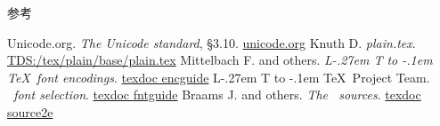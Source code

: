 \documentclass{beamer}
\makeatletter
\DeclareRobustCommand\LaTeX{L\kern-.27em%
  {\sbox\z@ T%
   \vbox to\ht\z@{\hbox{\check@mathfonts
                        \fontsize\sf@size\z@
                        \math@fontsfalse\selectfont
                        A}%
                  \vss}%
  }%
  \kern-.1em%
  \TeX}
\makeatother
\begin{document}
\begin{frame}{参考}
\begin{thebibliography}{9}
  Unicode.org.\enskip
  \textit{The Unicode standard}, \S3.10.\newblock
  \href{https://www.unicode.org/versions/latest/}
       {\ttfamily unicode.org}
  Knuth D.\enskip
  \textit{plain.tex}.\newblock
  \href{http://mirrors.ctan.org/macros/plain/base/plain.tex}
       {\ttfamily TDS:/tex/plain/base/plain.tex}
  Mittelbach F. and others.\enskip
  \textit{\LaTeX\ font encodings}.\newblock
  \href{http://mirrors.ctan.org/macros/latex/base/encguide.pdf}
       {\ttfamily texdoc encguide}
  \LaTeX\ Project Team.\enskip
  \textit{\LaTeXe\ font selection}.\newblock
  \href{http://mirrors.ctan.org/macros/latex/base/fntguide.pdf}
       {\ttfamily texdoc fntguide}
  Braams J. and others.\enskip
  \textit{The \LaTeXe\ sources}.\newblock
  \href{http://mirrors.ctan.org/macros/latex/base/source2e.pdf}
       {\ttfamily texdoc source2e}
\end{thebibliography}
\end{frame}
\end{document}
